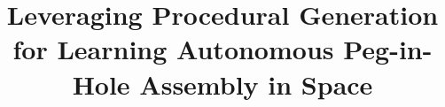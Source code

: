 \title{\textbf{Leveraging Procedural Generation for Learning Autonomous Peg-in-Hole Assembly in Space}}

